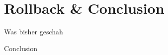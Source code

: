 \section{Rollback \& Conclusion}
\begin{frame}{Was bisher geschah}

\end{frame}
\begin{frame}{Conclusion}
    
\end{frame}